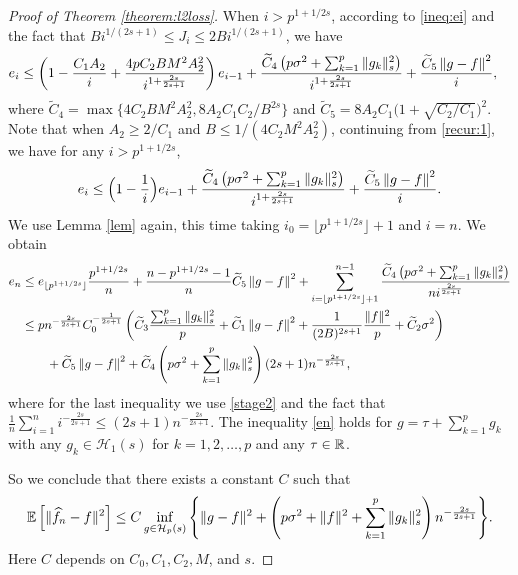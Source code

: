 \begin{proof}[Proof of Theorem \ref{theorem:l2loss}]
When $i > p^{1+1/2s}$, according to \eqref{ineq:ei} and the fact that $Bi^{1/(2s+1)} \leq J_i \leq 2Bi^{1/(2s+1)}$, we have
\begin{align}
    e_i & \leq \left(1-\frac{C_1A_2}{i}+\frac{4pC_2BM^2A_2^2}{i^{1+\frac{2s}{2s+1}}}\right)e_{i-1}+ \frac{\widetilde C_4\left(p\sigma^2+\sum_{k=1}^p\|g_k\|_s^2\right)}{i^{1+\frac{2s}{2s+1}}} + \frac{\widetilde C_5 \left\|g-f\right\|^2}{i},  \label{recur:1}
\end{align}
where $\tilde C_4 =  \max\{4C_2BM^2A_2^2, 8A_2C_1C_2/B^{2s}\}$ and $\tilde C_5 = 8A_2C_1\big(1+\sqrt{C_2/C_1}\big)^2$. Note that when $A_2 \geq 2/C_1$ and $B \leq 1/(4C_2M^2A_2^2)$, continuing from \eqref{recur:1}, we have for any $i > p^{1+1/2s}$,
\begin{align*}
    e_i \leq \Big(1-\frac{1}{i}\Big)e_{i-1} + \frac{\widetilde C_4\left(p\sigma^2+\sum_{k=1}^p\|g_k\|_s^2\right)}{i^{1+\frac{2s}{2s+1}}}+\frac{\widetilde C_5 \left\|g-f\right\|^2}{i}.
\end{align*}
We use Lemma \ref{lem} again, this time taking $i_0 = \lfloor p^{1+1/2s}\rfloor+1$ and $i=n$. We obtain
\begin{align}
    e_n &\leq e_{\lfloor p^{1+1/2s}\rfloor}\frac{p^{1+1/2s}}{n} + \frac{n - p^{1+1/2s}-1}{n}\widetilde C_5 \left\|g-f\right\|^2 + \sum_{i=\lfloor p^{1+1/2s}\rfloor+1}^{n-1}\frac{\widetilde C_4\left(p\sigma^2+\sum_{k=1}^p\|g_k\|_s^2\right)}{ni^{\frac{2s}{2s+1}}} \notag\\
    &\leq  pn^{-\frac{2s}{2s+1}}C_0^{-\frac{1}{2s+1}}\left( \widetilde C_3\frac{\sum_{k=1}^p\|g_k\|_s^2}{p} +\widetilde C_1 \left\|g-f\right\|^2 + \frac{1}{(2B)^{2s+1}}\frac{\|f\|^2}{p} +\widetilde C_2\sigma^2\right)\notag\\
    & \qquad +\widetilde C_5 \left\|g-f\right\|^2 + \widetilde C_4\left(p\sigma^2+\sum_{k=1}^p\|g_k\|_s^2\right)(2s+1)n^{-\frac{2s}{2s+1}}, \label{en}
\end{align}
where for the last inequality we use \eqref{stage2} and the fact that $\frac{1}{n}\sum_{i=1}^n i^{-\frac{2s}{2s+1}} \leq (2s+1)n^{-\frac{2s}{2s+1}}$.
The inequality \eqref{en} holds for $g = \tau + \sum_{k=1}^p g_k$ with any $g_k \in \mathcal{H}_1(s)$ for  $k=1,2,\dots,p$ and any $\tau \in \mathbb{R}$.

So we conclude that there exists a constant $C$ such that
\begin{equation*}
    \mathbb{E} \left[\| \widehat{f}_n - f\|^2 \right] \leq C\inf_{g\in \mathcal{H}_p(s)} \Bigg\{ \|g-f\|^2 + \left(p\sigma^2+\|f\|^2+\sum_{k=1}^p\|g_k\|^2_s \right) n^{-\frac{2s}{2s+1}}\Bigg\}.
\end{equation*}
Here $C$ depends on $C_0,C_1,C_2,M$, and $s$.
\end{proof}
